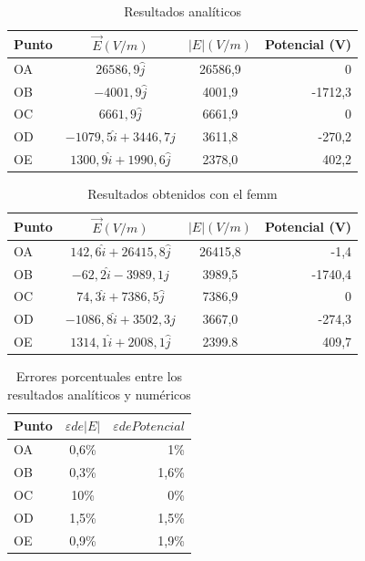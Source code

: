 \documentclass{article}
\begin{document}
    \begin{table}[H]
	\centering
	\begin{tabular}{|l | c | c | r|}
    	\hline
        Punto & $\overrightarrow{E} (V/m)$ & $|E| (V/m)$ &Potencial (V) \\ \hline
        OA & $26586,9\hat{j} $ & 26586,9 & 0 \\
        OB & $ - 4001,9 \hat{j}$ & 4001,9 & -1712,3 \\
        OC & $ 6661,9 \hat{j}$ & 6661,9 & 0 \\
        OD & $-1079,5 \hat{i} +  3446,7 \hat{j}$ & 3611,8 &-270,2 \\
        OE & $ 1300,9 \hat{i} + 1990,6 \hat{j}$ & 2378,0 &402,2 \\ \hline
	\end{tabular}
    \caption{Resultados analíticos}
    \end{table}

    \begin{table}[H]
	\centering
	\begin{tabular}{|l | c | c | r |}
    	\hline
        Punto & $\overrightarrow{E} (V/m)$ & $|E| (V/m)$ & Potencial (V) \\ \hline
        OA & $142,6 \hat{i} + 26415,8 \hat{j}$ & 26415,8 & -1,4 \\
        OB & $-62,2 \hat{i} - 3989,1 \hat{j}$ & 3989,5 & -1740,4 \\
        OC & $74,3 \hat{i} + 7386,5 \hat{j}$ & 7386,9 & 0 \\
        OD & $-1086,8 \hat{i} + 3502,3 \hat{j}$ & 3667,0 & -274,3 \\
        OE & $1314,1 \hat{i} + 2008,1 \hat{j}$ & 2399.8 & 409,7 \\ \hline
	\end{tabular}
    \caption{Resultados obtenidos con el femm}
    \end{table}
    
     \begin{table}[H]
	\centering
	\begin{tabular}{|l | c | r |}
    	\hline
        Punto & $\varepsilon de |E|$ & $\varepsilon de Potencial$\\ \hline
        OA & 0,6\% & 1\%\\
        OB & 0,3\% & 1,6\% \\
        OC & 10\% & 0\%\\
        OD & 1,5\% & 1,5\%\\
        OE & 0,9\% & 1,9\%\\ \hline
	\end{tabular}
    \caption{Errores porcentuales entre los resultados analíticos y numéricos}
    \end{table}
\end{document}
